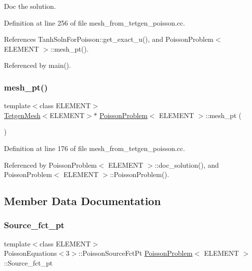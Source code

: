 Doc the solution. 



Definition at line 256 of file mesh\+\_\+from\+\_\+tetgen\+\_\+poisson.\+cc.



References Tanh\+Soln\+For\+Poisson\+::get\+\_\+exact\+\_\+u(), and Poisson\+Problem$<$ E\+L\+E\+M\+E\+N\+T $>$\+::mesh\+\_\+pt().



Referenced by main().

\mbox{\label{classPoissonProblem_abeab1d81ed6708e1eb0e9b0833598253}} 
\subsubsection{\texorpdfstring{mesh\+\_\+pt()}{mesh\_pt()}}
{\footnotesize\ttfamily template$<$class E\+L\+E\+M\+E\+NT$>$ \\
\hyperlink{classoomph_1_1TetgenMesh}{Tetgen\+Mesh}$<$E\+L\+E\+M\+E\+NT$>$$\ast$ \hyperlink{classPoissonProblem}{Poisson\+Problem}$<$ E\+L\+E\+M\+E\+NT $>$\+::mesh\+\_\+pt (\begin{DoxyParamCaption}{ }\end{DoxyParamCaption})\hspace{0.3cm}{\ttfamily [inline]}}



Definition at line 176 of file mesh\+\_\+from\+\_\+tetgen\+\_\+poisson.\+cc.



Referenced by Poisson\+Problem$<$ E\+L\+E\+M\+E\+N\+T $>$\+::doc\+\_\+solution(), and Poisson\+Problem$<$ E\+L\+E\+M\+E\+N\+T $>$\+::\+Poisson\+Problem().



\subsection{Member Data Documentation}
\mbox{\label{classPoissonProblem_adb4236a955db3200605ef5f9d7410a93}} 
\subsubsection{\texorpdfstring{Source\+\_\+fct\+\_\+pt}{Source\_fct\_pt}}
{\footnotesize\ttfamily template$<$class E\+L\+E\+M\+E\+NT$>$ \\
Poisson\+Equations$<$3$>$\+::Poisson\+Source\+Fct\+Pt \hyperlink{classPoissonProblem}{Poisson\+Problem}$<$ E\+L\+E\+M\+E\+NT $>$\+::Source\+\_\+fct\+\_\+pt\hspace{0.3cm}{\ttfamily [private]}}



